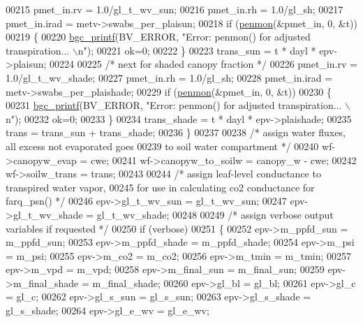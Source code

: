 \begin{DoxyCode}
00215         pmet\_in.rv = 1.0/gl\_t\_wv\_sun;
00216         pmet\_in.rh = 1.0/gl\_sh;
00217         pmet\_in.irad = metv->swabs\_per\_plaisun;
00218         \textcolor{keywordflow}{if} (\hyperlink{canopy__et_8c_a5c8d396ed94c7e0f3f4c80dd3ecd046c}{penmon}(&pmet\_in, 0, &t))
00219         \{
00220             \hyperlink{bgc__io_8c_af287cce6e2aede1ce337de9319e80d0d}{bgc\_printf}(BV\_ERROR, \textcolor{stringliteral}{"Error: penmon() for adjusted transpiration... \(\backslash\)n"});
00221             ok=0;
00222         \}
00223         trans\_sun = t * dayl * epv->plaisun;
00224         
00225         \textcolor{comment}{/* next for shaded canopy fraction */}
00226         pmet\_in.rv = 1.0/gl\_t\_wv\_shade;
00227         pmet\_in.rh = 1.0/gl\_sh;
00228         pmet\_in.irad = metv->swabs\_per\_plaishade;
00229         \textcolor{keywordflow}{if} (\hyperlink{canopy__et_8c_a5c8d396ed94c7e0f3f4c80dd3ecd046c}{penmon}(&pmet\_in, 0, &t))
00230         \{
00231             \hyperlink{bgc__io_8c_af287cce6e2aede1ce337de9319e80d0d}{bgc\_printf}(BV\_ERROR, \textcolor{stringliteral}{"Error: penmon() for adjusted transpiration... \(\backslash\)n"});
00232             ok=0;
00233         \}
00234         trans\_shade = t * dayl * epv->plaishade;
00235         trans = trans\_sun + trans\_shade;
00236     \}
00237         
00238     \textcolor{comment}{/* assign water fluxes, all excess not evaporated goes}
00239 \textcolor{comment}{    to soil water compartment */}
00240     wf->canopyw\_evap = cwe;
00241     wf->canopyw\_to\_soilw = canopy\_w - cwe;
00242     wf->soilw\_trans = trans;
00243     
00244     \textcolor{comment}{/* assign leaf-level conductance to transpired water vapor, }
00245 \textcolor{comment}{    for use in calculating co2 conductance for farq\_psn() */}
00246     epv->gl\_t\_wv\_sun = gl\_t\_wv\_sun; 
00247     epv->gl\_t\_wv\_shade = gl\_t\_wv\_shade;
00248     
00249     \textcolor{comment}{/* assign verbose output variables if requested */}
00250     \textcolor{keywordflow}{if} (verbose)
00251     \{
00252         epv->m\_ppfd\_sun  = m\_ppfd\_sun;
00253         epv->m\_ppfd\_shade  = m\_ppfd\_shade;
00254         epv->m\_psi   = m\_psi;
00255         epv->m\_co2   = m\_co2;
00256         epv->m\_tmin  = m\_tmin;
00257         epv->m\_vpd   = m\_vpd;
00258         epv->m\_final\_sun = m\_final\_sun;
00259         epv->m\_final\_shade = m\_final\_shade;
00260         epv->gl\_bl   = gl\_bl;
00261         epv->gl\_c    = gl\_c;
00262         epv->gl\_s\_sun   = gl\_s\_sun;
00263         epv->gl\_s\_shade = gl\_s\_shade;
00264         epv->gl\_e\_wv = gl\_e\_wv;

\end{DoxyCode}

